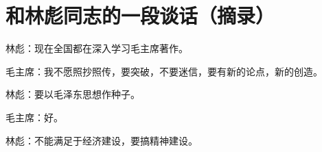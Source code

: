 \section[和林彪同志的一段谈话（摘录） ]{和林彪同志的一段谈话（摘录） }


林彪：现在全国都在深入学习毛主席著作。

毛主席：我不愿照抄照传，要突破，不要迷信，要有新的论点，新的创造。

林彪：要以毛泽东思想作种子。

毛主席：好。

林彪：不能满足于经济建设，要搞精神建设。

